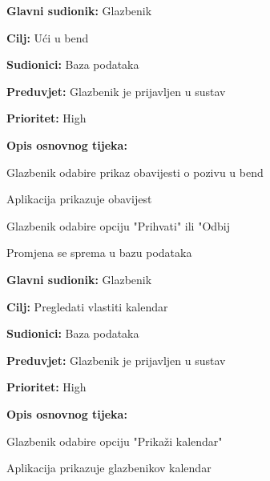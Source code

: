 \noindent {}
	\begin{packed_item}
		
		\item \textbf{Glavni sudionik:} Glazbenik
		\item \textbf{Cilj: } Ući u bend
		\item \textbf{Sudionici:} Baza podataka
		\item \textbf{Preduvjet:} Glazbenik je prijavljen u sustav
		\item \textbf{Prioritet:} High
		\item \textbf{Opis osnovnog tijeka:} 
		
		\item[] \begin{packed_enum}
			
			\item Glazbenik odabire prikaz obavijesti o pozivu u bend
			\item Aplikacija prikazuje obavijest
			\item Glazbenik odabire opciju "Prihvati" ili "Odbij
			\item Promjena se sprema u bazu podataka
		\end{packed_enum}
		
	\end{packed_item}
		
\noindent {}
	\begin{packed_item}
		
		\item \textbf{Glavni sudionik: } Glazbenik
		\item \textbf{Cilj:} Pregledati vlastiti kalendar
		\item \textbf{Sudionici:} Baza podataka
		\item \textbf{Preduvjet:} Glazbenik je prijavljen u sustav
		\item \textbf{Prioritet:} High
		\item \textbf{Opis osnovnog tijeka:} 
		
		\item[] \begin{packed_enum}
			
			\item Glazbenik odabire opciju "Prikaži kalendar"
			\item Aplikacija prikazuje glazbenikov kalendar
		\end{packed_enum}  
	\end{packed_item}
	
